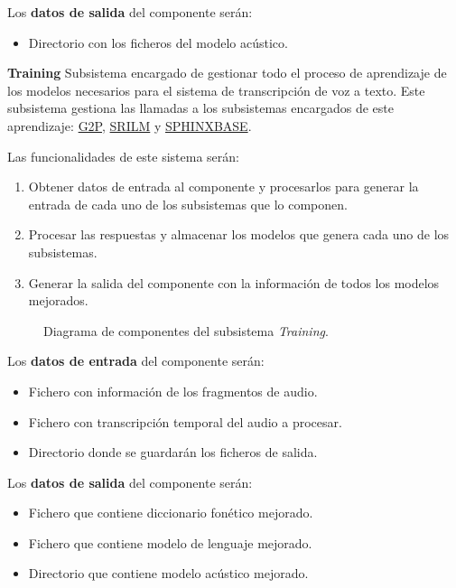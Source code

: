 \documentclass[../main.tex]{subfiles}
\begin{document}
Los \textbf{datos de salida} del componente serán:
\begin{itemize}
    \item Directorio con los ficheros del modelo acústico.
\end{itemize}

\textbf{Training}\label{par:training}
Subsistema encargado de gestionar todo el proceso de aprendizaje de los modelos necesarios para el sistema de transcripción de voz a texto. Este subsistema gestiona las llamadas a los subsistemas encargados de este aprendizaje: \hyperref[par:g2p]{G2P}, \hyperref[par:srilm]{SRILM} y \hyperref[par:sphinxbase]{SPHINXBASE}.

Las funcionalidades de este sistema serán:
\begin{enumerate}
    \item Obtener datos de entrada al componente y procesarlos para generar la entrada de cada uno de los subsistemas que lo componen.
    \item Procesar las respuestas y almacenar los modelos que genera cada uno de los subsistemas.
    \item Generar la salida del componente con la información de todos los modelos mejorados.
\end{enumerate}

\begin{figure}[H]
    \centering
    
    \label{fig:components_training}
    \caption{Diagrama de componentes del subsistema \textit{Training}.}
\end{figure}

Los \textbf{datos de entrada} del componente serán:
\begin{itemize}
    \item Fichero con información de los fragmentos de audio.
    \item Fichero con transcripción temporal del audio a procesar.
    \item Directorio donde se guardarán los ficheros de salida.
\end{itemize}

Los \textbf{datos de salida} del componente serán:
\begin{itemize}
    \item Fichero que contiene diccionario fonético mejorado.
    \item Fichero que contiene modelo de lenguaje mejorado.
    \item Directorio que contiene modelo acústico mejorado.
\end{itemize}
\end{document}
